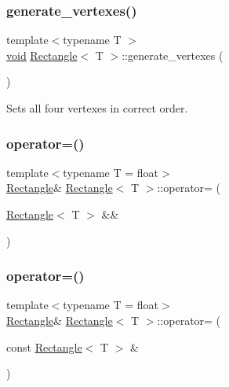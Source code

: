 \subsubsection{\texorpdfstring{generate\+\_\+vertexes()}{generate\_vertexes()}}
{\footnotesize\ttfamily template$<$typename T $>$ \\
\mbox{\hyperlink{glad_8h_a950fc91edb4504f62f1c577bf4727c29}{void}} \mbox{\hyperlink{classRectangle}{Rectangle}}$<$ T $>$\+::generate\+\_\+vertexes (\begin{DoxyParamCaption}{ }\end{DoxyParamCaption})\hspace{0.3cm}{\ttfamily [private]}}



Sets all four vertexes in correct order. 

\mbox{\label{classRectangle_ab53b617f14505834f525ec614ccce5c8}} 
\subsubsection{\texorpdfstring{operator=()}{operator=()}\hspace{0.1cm}{\footnotesize\ttfamily [1/2]}}
{\footnotesize\ttfamily template$<$typename T  = float$>$ \\
\mbox{\hyperlink{classRectangle}{Rectangle}}\& \mbox{\hyperlink{classRectangle}{Rectangle}}$<$ T $>$\+::operator= (\begin{DoxyParamCaption}\item[{\mbox{\hyperlink{classRectangle}{Rectangle}}$<$ T $>$ \&\&}]{ }\end{DoxyParamCaption})\hspace{0.3cm}{\ttfamily [default]}}

\mbox{\label{classRectangle_ad0a038c8959e5bde09bf1e8f49980bea}} 
\subsubsection{\texorpdfstring{operator=()}{operator=()}\hspace{0.1cm}{\footnotesize\ttfamily [2/2]}}
{\footnotesize\ttfamily template$<$typename T  = float$>$ \\
\mbox{\hyperlink{classRectangle}{Rectangle}}\& \mbox{\hyperlink{classRectangle}{Rectangle}}$<$ T $>$\+::operator= (\begin{DoxyParamCaption}\item[{const \mbox{\hyperlink{classRectangle}{Rectangle}}$<$ T $>$ \&}]{ }\end{DoxyParamCaption})\hspace{0.3cm}{\ttfamily [default]}}

